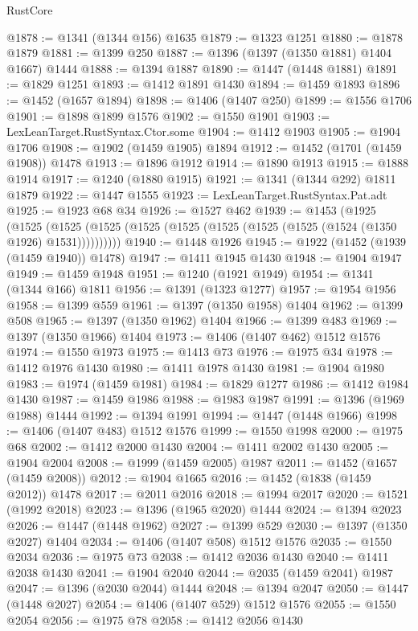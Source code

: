 \begin{lexlean}{RustCore}
\begin{coremodule}
@1878 := @1341 (@1344 @156) @1635
@1879 := @1323 @1251
@1880 := @1878 @1879
@1881 := @1399 @250
@1887 := @1396 (@1397 (@1350 @1881) @1404 @1667) @1444
@1888 := @1394 @1887
@1890 := @1447 (@1448 @1881)
@1891 := @1829 @1251
@1893 := @1412 @1891 @1430
@1894 := @1459 @1893
@1896 := @1452 (@1657 @1894)
@1898 := @1406 (@1407 @250)
@1899 := @1556 @1706
@1901 := @1898 @1899 @1576
@1902 := @1550 @1901
@1903 := LexLeanTarget.RustSyntax.Ctor.some
@1904 := @1412 @1903
@1905 := @1904 @1706
@1908 := @1902 (@1459 @1905) @1894
@1912 := @1452 (@1701 (@1459 @1908)) @1478
@1913 := @1896 @1912
@1914 := @1890 @1913
@1915 := @1888 @1914
@1917 := @1240 (@1880 @1915)
@1921 := @1341 (@1344 @292) @1811 @1879
@1922 := @1447 @1555
@1923 := LexLeanTarget.RustSyntax.Pat.adt
@1925 := @1923 @68 @34
@1926 := @1527 @462
@1939 := @1453
    (@1925
      (@1525 (@1525 (@1525 (@1525 (@1525 (@1525 (@1525 (@1525 (@1524 (@1350 @1926) @1531))))))))))
@1940 := @1448 @1926
@1945 := @1922 (@1452 (@1939 (@1459 @1940)) @1478)
@1947 := @1411 @1945 @1430
@1948 := @1904 @1947
@1949 := @1459 @1948
@1951 := @1240 (@1921 @1949)
@1954 := @1341 (@1344 @166) @1811
@1956 := @1391 (@1323 @1277)
@1957 := @1954 @1956
@1958 := @1399 @559
@1961 := @1397 (@1350 @1958) @1404
@1962 := @1399 @508
@1965 := @1397 (@1350 @1962) @1404
@1966 := @1399 @483
@1969 := @1397 (@1350 @1966) @1404
@1973 := @1406 (@1407 @462) @1512 @1576
@1974 := @1550 @1973
@1975 := @1413 @73
@1976 := @1975 @34
@1978 := @1412 @1976 @1430
@1980 := @1411 @1978 @1430
@1981 := @1904 @1980
@1983 := @1974 (@1459 @1981)
@1984 := @1829 @1277
@1986 := @1412 @1984 @1430
@1987 := @1459 @1986
@1988 := @1983 @1987
@1991 := @1396 (@1969 @1988) @1444
@1992 := @1394 @1991
@1994 := @1447 (@1448 @1966)
@1998 := @1406 (@1407 @483) @1512 @1576
@1999 := @1550 @1998
@2000 := @1975 @68
@2002 := @1412 @2000 @1430
@2004 := @1411 @2002 @1430
@2005 := @1904 @2004
@2008 := @1999 (@1459 @2005) @1987
@2011 := @1452 (@1657 (@1459 @2008))
@2012 := @1904 @1665
@2016 := @1452 (@1838 (@1459 @2012)) @1478
@2017 := @2011 @2016
@2018 := @1994 @2017
@2020 := @1521 (@1992 @2018)
@2023 := @1396 (@1965 @2020) @1444
@2024 := @1394 @2023
@2026 := @1447 (@1448 @1962)
@2027 := @1399 @529
@2030 := @1397 (@1350 @2027) @1404
@2034 := @1406 (@1407 @508) @1512 @1576
@2035 := @1550 @2034
@2036 := @1975 @73
@2038 := @1412 @2036 @1430
@2040 := @1411 @2038 @1430
@2041 := @1904 @2040
@2044 := @2035 (@1459 @2041) @1987
@2047 := @1396 (@2030 @2044) @1444
@2048 := @1394 @2047
@2050 := @1447 (@1448 @2027)
@2054 := @1406 (@1407 @529) @1512 @1576
@2055 := @1550 @2054
@2056 := @1975 @78
@2058 := @1412 @2056 @1430

\end{coremodule}
\end{lexlean}
